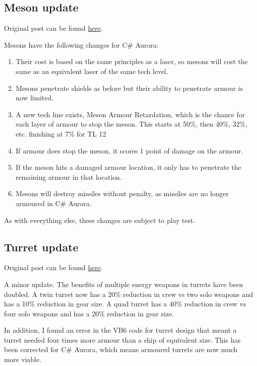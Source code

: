 \documentclass[../Aurora C# unofficial manual.tex]{subfiles}
\begin{document}
	\subsection{Meson update}
	Original post can be found
	\href{http://aurora2.pentarch.org/index.php?topic=8495.msg111663#msg111663}{here}.
	\newline\newline
	
	Mesons have the following changes for C\# Aurora:
	\begin{enumerate}
		\item Their cost is based on the same principles as a laser, so mesons will cost the same as an equivalent laser of the same tech level.
		\item Mesons penetrate shields as before but their ability to penetrate armour is now limited.
		\item A new tech line exists, Meson Armour Retardation, which is the chance for each layer of armour to stop the meson. This starts at 50\%, then 40\%, 32\%, etc. finishing at 7\% for TL 12
		\item If armour does stop the meson, it scores 1 point of damage on the armour.
		\item If the meson hits a damaged armour location, it only has to penetrate the remaining armour in that location.
		\item Mesons will destroy missiles without penalty, as missiles are no longer armoured in C\# Aurora.
	\end{enumerate}
	As with everything else, these changes are subject to play test.
	
	
	\subsection{Turret update}
	Original post can be found
	\href{http://aurora2.pentarch.org/index.php?topic=8495.msg103323#msg103323}{here}.
	\newline\newline
	
	A minor update. The benefits of multiple energy weapons in turrets have been doubled. A twin turret now has a 20\% reduction in crew vs two solo weapons and has a 10\% reduction in gear size. A quad turret has a 40\% reduction in crew vs four solo weapons and has a 20\% reduction in gear size.
	
	In addition, I found an error in the VB6 code for turret design that meant a turret needed four times more armour than a ship of equivalent size. This has been corrected for C\# Aurora, which means armoured turrets are now much more viable.
	
\end{document}
